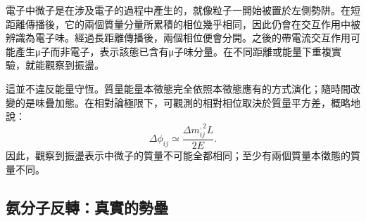 電子中微子是在涉及電子的過程中產生的，就像粒子一開始被置於左側勢阱。在短距離傳播後，它的兩個質量分量所累積的相位幾乎相同，因此仍會在交互作用中被辨識為電子味。經過長距離傳播後，兩個相位便會分開。之後的帶電流交互作用可能產生{\proseunicodefont μ}子而非電子，表示該態已含有{\proseunicodefont μ}子味分量。在不同距離或能量下重複實驗，就能觀察到振盪。

這並不違反能量守恆。質量能量本徵態完全依照本徵態應有的方式演化；隨時間改變的是味疊加態。在相對論極限下，可觀測的相對相位取決於質量平方差，概略地說：
\begin{equation}
\Delta\phi_{ij}\simeq \frac{\Delta m_{ij}^{,2}L}{2E}.
\end{equation}
因此，觀察到振盪表示中微子的質量不可能全都相同；至少有兩個質量本徵態的質量不同。

\begin{classroomqa}
\end{classroomqa}

\begin{classroomqa}
\end{classroomqa}

\begin{classroomqa}
\end{classroomqa}

\begin{classroomqa}
\end{classroomqa}

\subsection{氨分子反轉：真實的勢壘}

